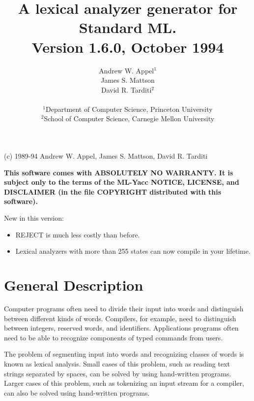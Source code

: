 \title{        A lexical analyzer generator for Standard ML.\\
			       Version 1.6.0, October 1994
      }
\author{                    Andrew W. Appel$^1$\\
	                    James S. Mattson\\
        	            David R. Tarditi$^2$\\
\\              
\small
$^1$Department of Computer Science, Princeton University \\
\small
$^2$School of Computer Science, Carnegie Mellon University
}
\date{}

\maketitle
\begin{center}
(c) 1989-94 Andrew W. Appel, James S. Mattson, David R. Tarditi
\end{center}

{\bf
This software comes with ABSOLUTELY NO WARRANTY.  It is subject only to
the terms of the ML-Yacc NOTICE, LICENSE, and DISCLAIMER (in the
file COPYRIGHT distributed with this software).
}

\vspace{1in}

New in this version:  
\begin{itemize}
\item REJECT is much less costly than before.
\item Lexical analyzers with more than 255 states can now compile in your
lifetime.
\end{itemize}

\newpage
\tableofcontents
\newpage

\section{General Description}

Computer programs often need to divide their input into words and
distinguish between different kinds of words.  Compilers, for
example, need to distinguish between integers, reserved words, and
identifiers.  Applications programs often need to be able to
recognize components of typed commands from users.

The problem of segmenting input into words and recognizing classes of
words is known as lexical analysis.  Small cases of this problem,
such as reading text strings separated by spaces, can be solved by
using hand-written programs.  Larger cases of this problem, such as
tokenizing an input stream for a compiler, can also be solved using
hand-written programs.

